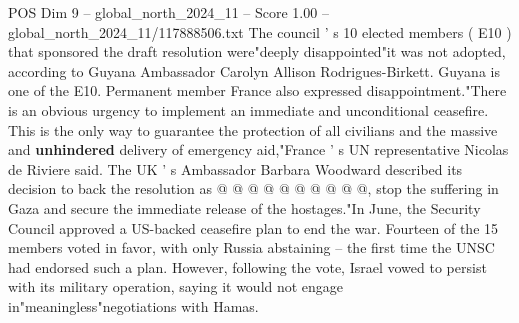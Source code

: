 \begin{textsample}{POS Dim 9 – global\_north\_2024\_11 – Score 1.00 – global\_north\_2024\_11/117888506.txt}
The council ' s 10 elected members ( E10 ) that sponsored the draft resolution were"deeply disappointed"it was not adopted, according to Guyana Ambassador Carolyn Allison Rodrigues-Birkett.
Guyana is one of the E10.
Permanent member France also expressed disappointment."There is an obvious urgency to implement an immediate and unconditional ceasefire.
This is the only way to guarantee the protection of all civilians and the massive and \textbf{unhindered} delivery of emergency aid,"France ' s UN representative Nicolas de Riviere said.
The UK ' s Ambassador Barbara Woodward described its decision to back the resolution as @ @ @ @ @ @ @ @ @ @, stop the suffering in Gaza and secure the immediate release of the hostages."In June, the Security Council approved a US-backed ceasefire plan to end the war.
Fourteen of the 15 members voted in favor, with only Russia abstaining -- the first time the UNSC had endorsed such a plan.
However, following the vote, Israel vowed to persist with its military operation, saying it would not engage in"meaningless"negotiations with Hamas.

\end{textsample}
